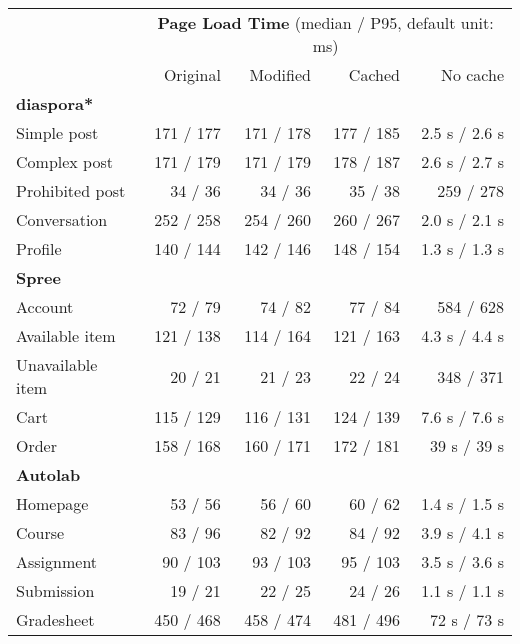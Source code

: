 \begin{tabular}{lrrrr}
\toprule
& \multicolumn{4}{c}{\textbf{Page Load Time} (median / P95, default unit: ms)} \\
\cmidrule(lr){2-5}
& Original & Modified & Cached & No cache \\ \midrule
\textbf{diaspora*}\\
    \quad{}Simple post & 171 / 177 & 171 / 178 & 177 / 185 & 2.5 s / 2.6 s \\ %
    \quad{}Complex post & 171 / 179 & 171 / 179 & 178 / 187 & 2.6 s / 2.7 s \\ %
    \quad{}Prohibited post & 34 / 36 & 34 / 36 & 35 / 38 & 259 / 278 \\
    \quad{}Conversation & 252 / 258 & 254 / 260 & 260 / 267 & 2.0 s / 2.1 s \\ %
    \quad{}Profile & 140 / 144 & 142 / 146 & 148 / 154 & 1.3 s / 1.3 s \\ %
\textbf{Spree}\\
    \quad{}Account & 72 / 79 & 74 / 82 & 77 / 84 & 584 / 628 \\
    \quad{}Available item & 121 / 138 & 114 / 164 & 121 / 163 & 4.3 s / 4.4 s \\ %
    \quad{}Unavailable item & 20 / 21 & 21 / 23 & 22 / 24 & 348 / 371 \\
    \quad{}Cart & 115 / 129 & 116 / 131 & 124 / 139 & 7.6 s / 7.6 s \\ %
    \quad{}Order & 158 / 168 & 160 / 171 & 172 / 181 & 39 s / 39 s \\ %
\textbf{Autolab}\\
    \quad{}Homepage & 53 / 56 & 56 / 60 & 60 / 62 & 1.4 s / 1.5 s \\ %
    \quad{}Course & 83 / 96 & 82 / 92 & 84 / 92 & 3.9 s / 4.1 s \\ %
    \quad{}Assignment & 90 / 103 & 93 / 103 & 95 / 103 & 3.5 s / 3.6 s \\ %
    \quad{}Submission & 19 / 21 & 22 / 25 & 24 / 26 & 1.1 s / 1.1 s \\ %
    \quad{}Gradesheet & 450 / 468 & 458 / 474 & 481 / 496 & 72 s / 73 s \\ %
\bottomrule
\end{tabular}
